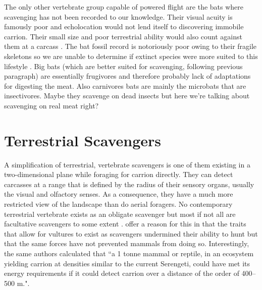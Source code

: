 \documentclass[a4paper,12pt]{article}
\begin{document}
The only other vertebrate group capable of powered flight are the bats where scavenging has not been recorded to our knowledge.
Their visual acuity is famously poor and echolocation would not lend itself to discovering immobile carrion.
Their small size and poor terrestrial ability would also count against them at a carcass \citep{riskin2006terrestrial}.
The bat fossil record is notoriously poor owing to their fragile skeletons so we are unable to determine if extinct species were more suited to this lifestyle \citep{eiting2009global}.
Big bats (which are better suited for scavenging, following previous paragraph) are essentially frugivores and therefore probably lack of adaptations for digesting the meat.
Also carnivores bats are mainly the microbats that are insectivores.
Maybe they scavenge on dead insects but here we're talking about scavenging on real meat right?

\section*{Terrestrial Scavengers}
A simplification of terrestrial, vertebrate scavengers is one of them existing in a two-dimensional plane while foraging for carrion directly.
They can detect carcasses at a range that is defined by the radius of their sensory organs, usually the visual and olfactory senses.
As a consequence, they have a much more restricted view of the landscape than do aerial foragers.
No contemporary terrestrial vertebrate exists as an obligate scavenger but most if not all are facultative scavengers to some extent \citep{beasley2015vertebrates}.
\cite{ruxton2004obligate} offer a reason for this in that the traits that allow for vultures to exist as scavengers undermined their ability to hunt but that the same forces have not prevented mammals from doing so.
Interestingly, the same authors calculated that ``a 1 tonne mammal or reptile, in an ecosystem yielding carrion at densities similar to the current Serengeti, could have met its energy requirements if it could detect carrion over a distance of the order of 400–500 m."\citep{ruxton2004obligate}.
\end{document}
